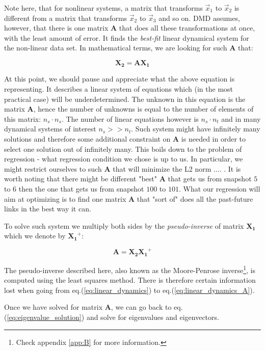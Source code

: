\documentclass[10pt,twocolumn]{article}
\begin{document}
Note here, that for nonlinear systems, a matrix that transforms $\vec{x}_1$ to $\vec{x}_2$ is different from a matrix that transforms $\vec{x}_2$ to $\vec{x}_3$ and so on. DMD assumes, however, that there is one matrix $\bm{A}$ that does all these transformations at once, with the least amount of error. It finds the \textit{best-fit} linear dynamical system for the non-linear data set. In mathematical terms, we are looking for such $\bm{A}$ that:

\begin{equation} \label{eq:linear_dynamics}
\bm{X_2} = \bm{A} \bm{X_1}
\end{equation}

At this point, we should pause and appreciate what the above equation is representing. It describes a linear system of equations which (in the most practical case) will be underdetermined. The unknown in this equation is the matrix $\bm{A}$, hence the number of unknowns is equal to the number of elements of this matrix: $n_s \cdot n_s$. The number of linear equations however is $n_s \cdot n_t$ and in many dynamical systems of interest $n_s >> n_t$. Such system might have infinitely many solutions and therefore some additional constraint on $\bm{A}$ is needed in order to select one solution out of infinitely many. This boils down to the problem of regression - what regression condition we chose is up to us. In particular, we might restrict ourselves to such $\bm{A}$ that will minimize the L2 norm .... . It is worth noting that there might be different "best" $\bm{A}$ that gets us from snapshot $5$ to $6$ then the one that gets us from snapshot $100$ to $101$. What our regression will aim at optimizing is to find one matrix $\bm{A}$ that "sort of" does all the past-future links in the best way it can.

To solve such system we multiply both sides by the \textit{pseudo-inverse} of matrix $\bm{X_1}$ which we denote by $\bm{X_1}^{+}$:

\begin{equation} \label{eq:linear_dynamics_A}
\bm{A} = \bm{X_2} \bm{X_1}^{+}
\end{equation}

The pseudo-inverse described here, also known as the Moore-Penrose inverse\footnote{Check appendix \ref{app:B} for more information.}, is computed using the least squares method. There is therefore certain information lost when going from eq.(\ref{eq:linear_dynamics}) to eq.(\ref{eq:linear_dynamics_A}).

Once we have solved for matrix $\bm{A}$, we can go back to eq.(\ref{eq:eigenvalue_solution}) and solve for eigenvalues and eigenvectors.
\end{document}
